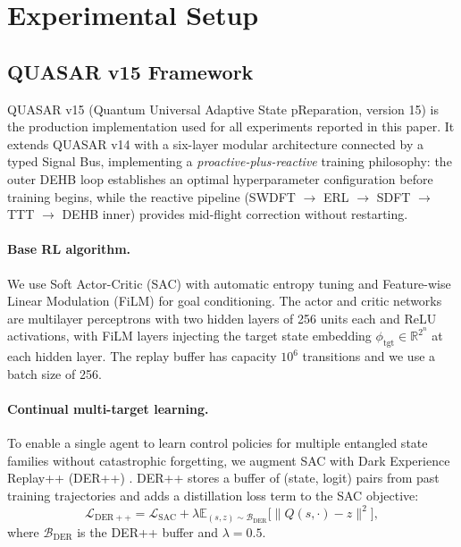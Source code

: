 \section{Experimental Setup}
\label{sec:experiments}

\subsection{QUASAR v15 Framework}

QUASAR v15 (Quantum Universal Adaptive State pReparation, version 15) is the
production implementation used for all experiments reported in this paper.
It extends QUASAR v14 with a six-layer modular architecture connected by a
typed Signal Bus, implementing a \emph{proactive-plus-reactive} training
philosophy: the outer DEHB loop establishes an optimal hyperparameter
configuration before training begins, while the reactive pipeline (SWDFT
$\to$ ERL $\to$ SDFT $\to$ TTT $\to$ DEHB inner) provides mid-flight
correction without restarting.

\paragraph{Base RL algorithm.}
We use Soft Actor-Critic (SAC) \cite{haarnoja2018soft} with automatic entropy
tuning and Feature-wise Linear Modulation (FiLM) \cite{perez2018film} for
goal conditioning. The actor and critic networks are multilayer perceptrons
with two hidden layers of 256 units each and ReLU activations, with FiLM
layers injecting the target state embedding $\phi_{\mathrm{tgt}} \in \mathbb{R}^{2^n}$
at each hidden layer. The replay buffer has capacity $10^6$ transitions and
we use a batch size of 256.

\paragraph{Continual multi-target learning.}
To enable a single agent to learn control policies for multiple entangled state
families without catastrophic forgetting, we augment SAC with Dark Experience
Replay++ (DER++) \cite{buzzega2020dark}. DER++ stores a buffer of (state, logit)
pairs from past training trajectories and adds a distillation loss term to the
SAC objective:
\begin{equation}
  \mathcal{L}_{\mathrm{DER++}} = \mathcal{L}_{\mathrm{SAC}} +
  \lambda \mathbb{E}_{(s, z) \sim \mathcal{B}_{\mathrm{DER}}}
  \bigl[\|Q(s, \cdot) - z\|^2\bigr],
\end{equation}
where $\mathcal{B}_{\mathrm{DER}}$ is the DER++ buffer and $\lambda = 0.5$.

